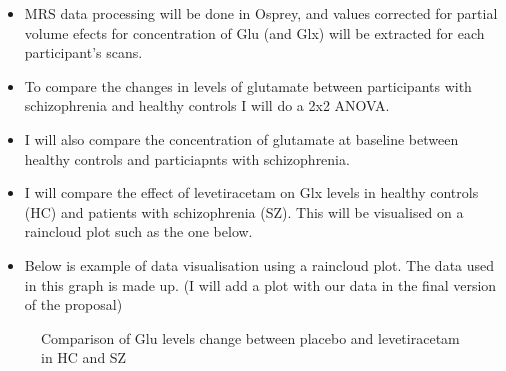 \documentclass[
  letterpaper,
  DIV=11,
  numbers=noendperiod]{scrartcl}
\providecommand{\tightlist}{%
  \setlength{\itemsep}{0pt}\setlength{\parskip}{0pt}}\usepackage{longtable,booktabs,array}
\begin{document}
\begin{itemize}
\tightlist
\item
  MRS data processing will be done in Osprey, and values corrected for
  partial volume efects for concentration of Glu (and Glx) will be
  extracted for each participant's scans.
\item
  To compare the changes in levels of glutamate between participants
  with schizophrenia and healthy controls I will do a 2x2 ANOVA.
\item
  I will also compare the concentration of glutamate at baseline between
  healthy controls and particiapnts with schizophrenia.
\item
  I will compare the effect of levetiracetam on Glx levels in healthy
  controls (HC) and patients with schizophrenia (SZ). This will be
  visualised on a raincloud plot such as the one below.
\item
  Below is example of data visualisation using a raincloud plot. The
  data used in this graph is made up. (I will add a plot with our data
  in the final version of the proposal)
\end{itemize}

\begin{figure}


\caption{\label{fig-lev_hc_vs_sz}Comparison of Glu levels change between
placebo and levetiracetam in HC and SZ}

\end{figure}%
\end{document}
